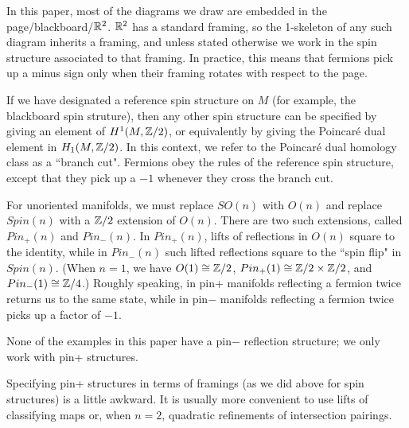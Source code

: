 In this paper, most of the diagrams we draw are embedded in the page/blackboard/$\mathbb{R}^2$.
$\mathbb{R}^2$ has a standard framing, so the 1-skeleton of any such diagram inherits a framing, and unless stated otherwise we work in the spin
structure associated to that framing.
In practice, this means that fermions pick up a minus sign only when their framing rotates with respect to the page.

If we have designated a reference spin structure on $M$ (for example, the blackboard spin struture), 
then any other spin structure can be specified by giving an
element of $H^1(M, \mathbb{Z}/2)$, or equivalently by giving the Poincar\'e dual element in $H_1(M, \mathbb{Z}/2)$.
In this context, we refer to the Poincar\'e dual homology class as a ``branch cut".
Fermions obey the rules of the reference spin structure, except that they pick up a $-1$ whenever they cross the branch cut.

\medskip

For unoriented manifolds, we must replace $SO(n)$ with $O(n)$ and replace $Spin(n)$ with a $\mathbb{Z}/2$ extension of $O(n)$.
There are two such extensions, called $Pin_+(n)$ and $Pin_-(n)$.
In $Pin_+(n)$, lifts of reflections in $O(n)$ square to the identity, while in $Pin_-(n)$ such lifted reflections square to the ``spin flip"
in $Spin(n)$.
(When $n=1$, we have $O(1)\cong\mathbb{Z}/2$, $Pin_+(1)\cong\mathbb{Z}/2\times\mathbb{Z}/2$, and $Pin_-(1)\cong\mathbb{Z}/4$.)
Roughly speaking, in pin+ manifolds reflecting a fermion twice returns us to the same state, while in pin$-$ manifolds reflecting a fermion twice
picks up a factor of $-1$.

None of the examples in this paper have a pin$-$ reflection structure; we only work with pin+ structures.

Specifying pin+ structures in terms of framings (as we did above for spin structures) is a little awkward.
It is usually more convenient to use lifts of classifying maps or, when $n=2$, quadratic refinements of intersection pairings.

